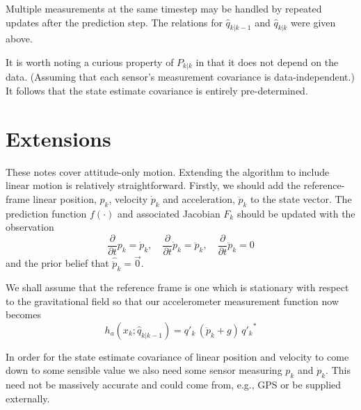 \documentclass[a4paper]{paper}
\begin{document}
Multiple measurements at the same timestep may be handled by repeated updates
after the prediction step. The relations for $\hat{q}_{k|k-1}$ and
$\hat{q}_{k|k}$ were given above.

It is worth noting a curious property of $P_{k|k}$ in that it does not depend
on the data. (Assuming that each sensor's measurement covariance is
data-independent.) It follows that the state estimate covariance is entirely
pre-determined.

\section{Extensions}

These notes cover attitude-only motion. Extending the algorithm to include
linear motion is relatively straightforward. Firstly, we should add the
reference-frame linear position, $p_k$, velocity $\dot{p}_k$ and acceleration,
$\ddot{p}_k$ to the state vector. The prediction function $f(\cdot)$ and
associated Jacobian $F_k$ should be updated with the observation
$$
\frac{\partial}{\partial t} p_k = \dot{p}_k, \quad
\frac{\partial}{\partial t} \dot{p}_k = \ddot{p}_k, \quad
\frac{\partial}{\partial t} \ddot{p}_k = 0
$$
and the prior belief that $\hat{\ddot{p}}_k = \vec{0}$.

We shall assume that the reference frame is one which is stationary with respect
to the gravitational field so that our accelerometer measurement function now
becomes
$$
h_a(x_k; \hat{q}_{k|k-1}) = q'_k \, (\ddot{p}_k + g) \, {q'_k}^*
$$

In order for the state estimate covariance of linear position and velocity to
come down to some sensible value we also need some sensor measuring $p_k$ and
$\dot{p}_k$. This need not be massively accurate and could come from, e.g.,
GPS or be supplied externally.



\end{document}
